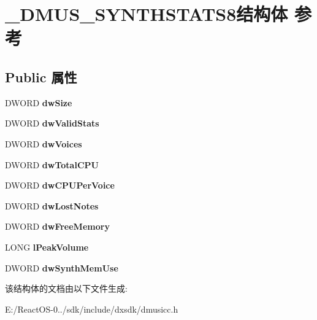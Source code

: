 \hypertarget{struct___d_m_u_s___s_y_n_t_h_s_t_a_t_s8}{}\section{\+\_\+\+D\+M\+U\+S\+\_\+\+S\+Y\+N\+T\+H\+S\+T\+A\+T\+S8结构体 参考}
\label{struct___d_m_u_s___s_y_n_t_h_s_t_a_t_s8}
\subsection*{Public 属性}
\begin{DoxyCompactItemize}
\item 
\mbox{\label{struct___d_m_u_s___s_y_n_t_h_s_t_a_t_s8_af1fa76e57c22aad8b30bb86188f0871e}} 
D\+W\+O\+RD {\bfseries dw\+Size}
\item 
\mbox{\label{struct___d_m_u_s___s_y_n_t_h_s_t_a_t_s8_ad0a50eb39e5e9ee544fe7e0a4ab8325d}} 
D\+W\+O\+RD {\bfseries dw\+Valid\+Stats}
\item 
\mbox{\label{struct___d_m_u_s___s_y_n_t_h_s_t_a_t_s8_a9bc7efdbc12933392d399fc9761e04a9}} 
D\+W\+O\+RD {\bfseries dw\+Voices}
\item 
\mbox{\label{struct___d_m_u_s___s_y_n_t_h_s_t_a_t_s8_af7b0ff7c3794608a198590f8ea064639}} 
D\+W\+O\+RD {\bfseries dw\+Total\+C\+PU}
\item 
\mbox{\label{struct___d_m_u_s___s_y_n_t_h_s_t_a_t_s8_a126b8f3ef0b9cd95ab76e0c7f47ffc4a}} 
D\+W\+O\+RD {\bfseries dw\+C\+P\+U\+Per\+Voice}
\item 
\mbox{\label{struct___d_m_u_s___s_y_n_t_h_s_t_a_t_s8_aeec7dcdab6f52a55ced5927521ae9bd3}} 
D\+W\+O\+RD {\bfseries dw\+Lost\+Notes}
\item 
\mbox{\label{struct___d_m_u_s___s_y_n_t_h_s_t_a_t_s8_a65da96cb026bfde1138e3388b2d07db3}} 
D\+W\+O\+RD {\bfseries dw\+Free\+Memory}
\item 
\mbox{\label{struct___d_m_u_s___s_y_n_t_h_s_t_a_t_s8_ad215c370ffd0a8b7f5fdc23568d341a0}} 
L\+O\+NG {\bfseries l\+Peak\+Volume}
\item 
\mbox{\label{struct___d_m_u_s___s_y_n_t_h_s_t_a_t_s8_a5447a94cbcdfc1d553b89310139f51ff}} 
D\+W\+O\+RD {\bfseries dw\+Synth\+Mem\+Use}
\end{DoxyCompactItemize}


该结构体的文档由以下文件生成\+:\begin{DoxyCompactItemize}
\item 
E\+:/\+React\+O\+S-\/0../sdk/include/dxsdk/dmusicc.\+h\end{DoxyCompactItemize}
